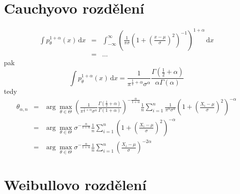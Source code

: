 \documentclass[11pt]{article}
\newcommand{\intpa}{\int p_\theta^{1+\alpha}(x) \, \mathrm{d}x }
\newcommand{\amtiT}{\arg \max_{\theta \in \Theta}}
\begin{document}
\section{Cauchyovo rozdělení}

\begin{eqnarray}
\intpa & = & \int_{-\infty }^{\infty } \left( \frac{1}{\pi \sigma} \left( 1 + \left( \frac{x - \mu}{\sigma} \right) ^2 \right)^{-1} \right)^{1+\alpha} \, \mathrm{d}x \nonumber\\
& = & \ldots \nonumber
\end{eqnarray} 
pak
\begin{equation}
\intpa = \frac{1}{\pi^{\frac{1}{2}+\alpha}\sigma^\alpha} \frac{\Gamma(\frac{1}{2} + \alpha)}{\alpha\Gamma(\alpha)}
\end{equation}
tedy
\begin{eqnarray}
	\theta_{\alpha,n} & = & \amtiT \left( \frac{1}{\pi^{\frac{1}{2}+\alpha}\sigma^\alpha} \frac{\Gamma(\frac{1}{2} + \alpha)}{\Gamma(1+\alpha)} \right)^{-\frac{\alpha}{1+\alpha}} 
	\frac{1}{n} \sum_{i=1}^n \frac{1}{\pi^\alpha\sigma^\alpha}\left( 1 + \left( \frac{X_i-\mu}{\sigma} \right)^2 \right)^{-\alpha} \nonumber \\
	& = & \amtiT \sigma^{-\frac{\alpha}{1+\alpha}} \frac{1}{n} \sum_{i=1}^n \left( 1 + \left( \frac{X_i-\mu}{\sigma} \right)^2 \right)^{-\alpha} \nonumber \\
	& = & \amtiT \sigma^{-\frac{\alpha}{1+\alpha}} \frac{1}{n} \sum_{i=1}^n \left( \frac{X_i-\mu}{\sigma} \right)^{-2\alpha}
\end{eqnarray}


\section{Weibullovo rozdělení}
\end{document}

